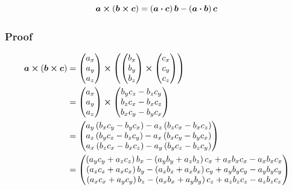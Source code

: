 \documentclass{article}
\renewcommand{\vec}[1]{\boldsymbol{#1}}
\begin{document}
\[ \vec{a} \cross \left( \vec{b} \cross \vec{c} \right) = \left( \vec{a} \vdot \vec{c} \right) \vec{b} - \left( \vec{a} \vdot \vec{b} \right) \vec{c} \]

\subsubsection{Proof}

\begin{align*}
    \vec{a} \cross \left( \vec{b} \cross \vec{c} \right) &=
    \begin{pmatrix} a_x \\ a_y \\ a_z \end{pmatrix} \cross \left( \begin{pmatrix} b_x \\ b_y \\ b_z \end{pmatrix} \cross \begin{pmatrix} c_x \\ c_y \\ c_z \end{pmatrix} \right) \\ 
    &= \begin{pmatrix} a_x \\ a_y \\ a_z \end{pmatrix} \cross \begin{pmatrix} b_y c_z - b_z c_y \\ b_z c_x - b_x c_z \\ b_x c_y - b_y c_x \end{pmatrix} \\
    &= \begin{pmatrix} a_y \left( b_x c_y - b_y c_x \right) - a_z \left( b_z c_x - b_x c_z \right) \\ a_z \left( b_y c_z - b_z c_y \right) - a_x \left( b_x c_y - b_y c_x \right) \\ a_x \left( b_z c_x - b_x c_z \right) - a_y \left( b_y c_z - b_z c_y \right) \end{pmatrix} \\
    &= \begin{pmatrix} \left( a_y c_y + a_z c_z \right) b_x - \left( a_y b_y + a_z b_z \right) c_x + a_x b_x c_x - a_x b_x c_x \\ \left( a_z c_z + a_x c_x \right) b_y - \left( a_z b_z + a_x b_x \right) c_y + a_y b_y c_y - a_y b_y c_y \\ \left( a_x c_x + a_y c_y \right) b_z - \left( a_x b_x + a_y b_y \right) c_z + a_z b_z c_z - a_z b_z c_z \end{pmatrix} \\

\end{align*}
\end{document}
